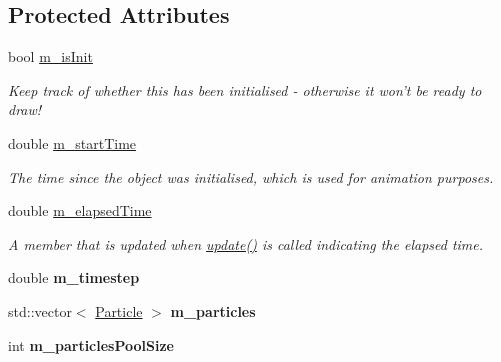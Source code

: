 \subsection*{Protected Attributes}
\begin{DoxyCompactItemize}
\item 
\hypertarget{classWorld_a8d2c7904c78772cd416046f17e8fde9a}{bool \hyperlink{classWorld_a8d2c7904c78772cd416046f17e8fde9a}{m\-\_\-is\-Init}}\label{classWorld_a8d2c7904c78772cd416046f17e8fde9a}

\begin{DoxyCompactList}\small\item\em Keep track of whether this has been initialised -\/ otherwise it won't be ready to draw! \end{DoxyCompactList}\item 
\hypertarget{classWorld_aea913074e52f86a713d2fd2e3ab4c84f}{double \hyperlink{classWorld_aea913074e52f86a713d2fd2e3ab4c84f}{m\-\_\-start\-Time}}\label{classWorld_aea913074e52f86a713d2fd2e3ab4c84f}

\begin{DoxyCompactList}\small\item\em The time since the object was initialised, which is used for animation purposes. \end{DoxyCompactList}\item 
\hypertarget{classWorld_a96627a74533eb71253e347b1d5754380}{double \hyperlink{classWorld_a96627a74533eb71253e347b1d5754380}{m\-\_\-elapsed\-Time}}\label{classWorld_a96627a74533eb71253e347b1d5754380}

\begin{DoxyCompactList}\small\item\em A member that is updated when \hyperlink{classWorld_ab3f32d708c9f53e337f8352ac3b0641d}{update()} is called indicating the elapsed time. \end{DoxyCompactList}\item 
\hypertarget{classWorld_ac07d502be70b521c99aee1876919d5dd}{double {\bfseries m\-\_\-timestep}}\label{classWorld_ac07d502be70b521c99aee1876919d5dd}

\item 
\hypertarget{classWorld_a927cf4a925c2e45a5994fdf4ed935088}{std\-::vector$<$ \hyperlink{classParticle}{Particle} $>$ {\bfseries m\-\_\-particles}}\label{classWorld_a927cf4a925c2e45a5994fdf4ed935088}

\item 
\hypertarget{classWorld_a29c3c75f7459ce8fd396885cd2cf508d}{int {\bfseries m\-\_\-particles\-Pool\-Size}}\label{classWorld_a29c3c75f7459ce8fd396885cd2cf508d}


\end{DoxyCompactItemize}
